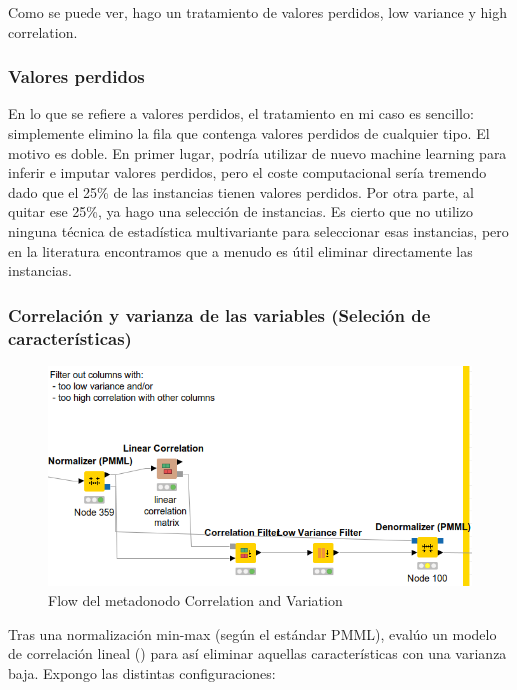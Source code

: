 Como se puede ver, hago un tratamiento de valores perdidos, low variance y high correlation.

\subsubsection{Valores perdidos}

En lo que se refiere a valores perdidos, el tratamiento en mi caso es sencillo: simplemente elimino la fila que contenga valores perdidos de cualquier tipo. El motivo es doble. En primer lugar, podría utilizar de nuevo machine learning para inferir e imputar valores perdidos, pero el coste computacional sería tremendo dado que el 25\% de las instancias tienen valores perdidos. Por otra parte, al quitar ese 25\%, ya hago una selección de instancias. Es cierto que no utilizo ninguna técnica de estadística multivariante para seleccionar esas instancias, pero en la literatura encontramos que a menudo es útil eliminar directamente las instancias.

\subsubsection{Correlación y varianza de las variables (Seleción de características)}

\begin{figure}[H] %
	\centering
	\includegraphics[scale=0.5]{flow-cr.png}  %
	\caption{Flow del metadonodo Correlation and Variation} 
	\label{fig:flow-cv}
\end{figure}

Tras una normalización min-max (según el estándar PMML), evalúo un modelo de correlación lineal (\cite{cf}) para así eliminar aquellas características con una varianza baja. Expongo las distintas configuraciones:

